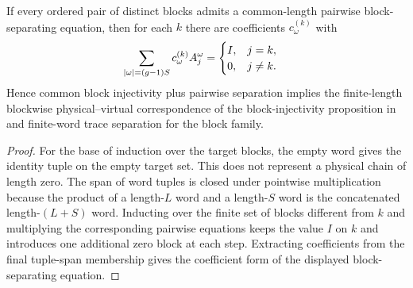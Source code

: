 \begin{lemma}
    \label{lem:block_separating_equations_from_pairwise_separation}
    \leanok
    If every ordered pair of distinct blocks admits a common-length pairwise
    block-separating equation, then for each $k$ there are coefficients
    $c_\omega^{(k)}$ with
    \begin{align}
        \sum_{|\omega|=(g-1)S} c_\omega^{(k)} A_j^\omega
         & =
        \begin{cases}
            I, & j=k,    \\
            0, & j\ne k.
        \end{cases}
        \notag
    \end{align}
    Hence common block injectivity plus pairwise separation implies the
    finite-length blockwise physical--virtual correspondence of the
    block-injectivity proposition in \cite[Section~2.3]{Cirac2016MPDO_arXiv}
    and finite-word trace separation for the block family.
\end{lemma}

\begin{proof}
    \leanok
    For the base of induction over the target blocks, the empty word gives the
    identity tuple on the empty target set. This does not represent a physical
    chain of length zero. The span of word tuples is closed under pointwise
    multiplication because the product of a length-$L$ word and a length-$S$
    word is the concatenated length-$(L+S)$ word. Inducting over the finite set
    of blocks different from $k$ and multiplying the corresponding pairwise
    equations keeps the value $I$ on $k$ and introduces one additional zero
    block at each step. Extracting coefficients from the final tuple-span
    membership gives the coefficient form of the displayed block-separating
    equation.
\end{proof}

